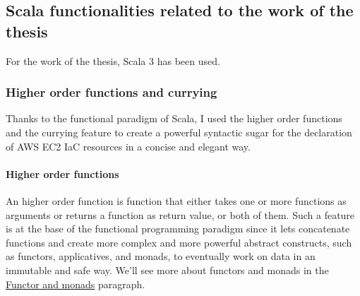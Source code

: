\subsection{Scala functionalities related to the work of the thesis}
For the work of the thesis, Scala 3 has been used.

\subsubsection{Higher order functions and currying}
Thanks to the functional paradigm of Scala, I used the higher order functions and the currying feature to create a powerful syntactic sugar for the declaration of AWS EC2 IaC resources in a 
concise and elegant way.
\paragraph{Higher order functions}
An higher order function is function that either takes one or more functions as arguments or returns a function as return value, or both of them.
Such a feature is at the base of the functional programming paradigm since it lets concatenate functions and create more complex and more powerful abstract constructs, such as functors, applicatives, and monads, to eventually work on data in an immutable and safe way.
We'll see more about functors and monads in the \hyperref[sssec:functors-monads]{Functor and monads} paragraph.
